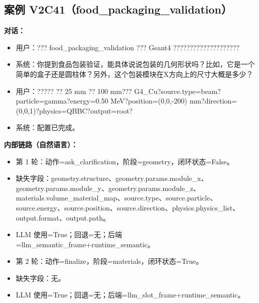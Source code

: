 \documentclass[11pt]{ctexart}
\begin{document}
\subsection{案例 V2C41（food\_packaging\_validation）}
\textbf{对话：}
\begin{itemize}
\item 用户：??? food\_packaging\_validation ??? Geant4 ????????????????????
\item 系统：你提到食品包装验证，能具体说说包装的几何形状吗？比如，它是一个简单的盒子还是圆柱体？另外，这个包装模块在X方向上的尺寸大概是多少？
\item 用户：????? ?? 25 mm ?? 100 mm??? G4\_Cu?source.type=beam?particle=gamma?energy=0.50 MeV?position=(0,0,-200) mm?direction=(0,0,1)?physics=QBBC?output=root?
\item 系统：配置已完成。
\end{itemize}
\textbf{内部链路（自然语言）：}
\begin{itemize}
\item 第 1 轮：动作=ask\_clarification，阶段=geometry，闭环状态=False。
\item 缺失字段：geometry.structure、geometry.params.module\_x、geometry.params.module\_y、geometry.params.module\_z、materials.volume\_material\_map、source.type、source.particle、source.energy、source.position、source.direction、physics.physics\_list、output.format、output.path。
\item LLM 使用=True；回退=无；后端=llm\_semantic\_frame+runtime\_semantic。
\item 第 2 轮：动作=finalize，阶段=materials，闭环状态=True。
\item 缺失字段：无。
\item LLM 使用=True；回退=无；后端=llm\_slot\_frame+runtime\_semantic。
\end{itemize}
\end{document}
